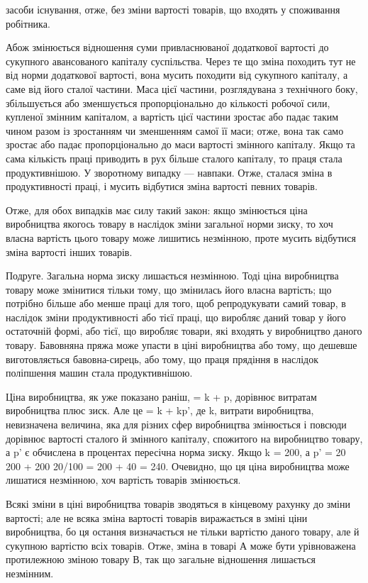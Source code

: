 засоби існування, отже, без зміни вартості товарів, що входять у споживання робітника.

Абож змінюється відношення суми привласнюваної додаткової вартості до сукупного авансованого
капіталу суспільства. Через те що зміна походить тут не від норми додаткової вартості, вона мусить
походити від сукупного капіталу, а саме від його сталої частини. Маса цієї частини, розглядувана з
технічного боку, збільшується або зменшується пропорціонально до кількості робочої сили, купленої
змінним капіталом, а вартість цієї частини зростає або падає таким чином разом із зростанням чи
зменшенням самої її маси; отже, вона так само зростає або падає пропорціонально до маси вартості
змінного капіталу. Якщо та сама кількість праці приводить в рух більше сталого капіталу, то праця
стала продуктивнішою. У зворотному випадку — навпаки. Отже, сталася зміна в продуктивності праці, і
мусить відбутися зміна вартості певних товарів.

Отже, для обох випадків має силу такий закон: якщо змінюється ціна виробництва якогось товару в
наслідок зміни загальної норми зиску, то хоч власна вартість цього товару може лишитись незмінною,
проте мусить відбутися зміна вартості інших товарів.

 Подруге. Загальна норма зиску лишається незмінною. Тоді ціна виробництва товару може змінитися
тільки тому, що змінилась його власна вартість; що потрібно більше або менше праці для того, щоб
репродукувати самий товар, в наслідок зміни продуктивності або тієї праці, що виробляє даний товар у
його остаточній формі, або тієї, що виробляє товари, які входять у виробництво даного товару.
Бавовняна пряжа може упасти в ціні виробництва або тому, що дешевше виготовляється бавовна-сирець,
або тому, що праця прядіння в наслідок поліпшення машин стала продуктивнішою.

Ціна виробництва, як уже показано раніш, = k + p, дорівнює витратам виробництва плюс зиск. Але це =
k + kp', де k, витрати виробництва, невизначена величина, яка для різних сфер виробництва змінюється
і повсюди дорівнює вартості сталого й змінного капіталу, спожитого на виробництво товару, а p' є
обчислена в процентах пересічна норма зиску. Якщо k = 200, а p' = 20%
200 + 200 20/100 = 200
+ 40 = 240. Очевидно, що ця ціна виробництва може лишатися незмінною, хоч вартість товарів
змінюється.

Всякі зміни в ціні виробництва товарів зводяться в кінцевому рахунку до зміни вартості; але не всяка
зміна вартості товарів виражається в зміні ціни виробництва, бо ця остання визначається не тільки
вартістю даного товару, але й сукупною вартістю всіх товарів. Отже, зміна в товарі А може бути
урівноважена протилежною зміною товару В, так що загальне відношення лишається незмінним.
